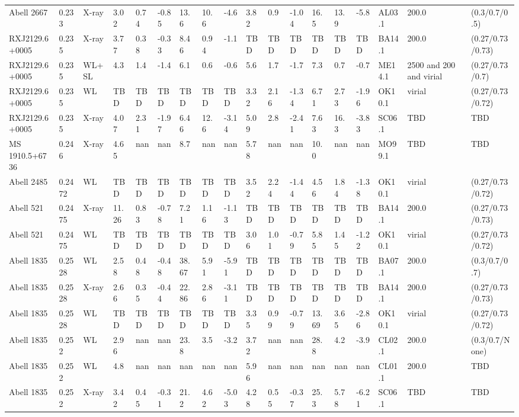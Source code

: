 \documentclass{article}
\begin{document}
\begin{center}
\begin{landscape}
\begin{longtable}{llllllllllllllllll}
Abell 2667 & 0.233 & X-ray & 3.02 & 0.74 & -0.85 & 13.6 & 10.6 & -4.6 & 3.82 & 0.9 & -1.04 & 16.5 & 13.9 & -5.8 & AL03.1 & 200.0 & (0.3/0.7/0.5) \\
RXJ2129.6+0005 & 0.235 & X-ray & 3.77 & 0.38 & -0.33 & 8.46 & 0.94 & -1.1 & TBD & TBD & TBD & TBD & TBD & TBD & BA14.1 & 200.0 & (0.27/0.73/0.73) \\
RXJ2129.6+0005 & 0.235 & WL+SL & 4.3 & 1.4 & -1.4 & 6.1 & 0.6 & -0.6 & 5.6 & 1.7 & -1.7 & 7.3 & 0.7 & -0.7 & ME14.1 & 2500 and 200 and virial & (0.27/0.73/0.7) \\
RXJ2129.6+0005 & 0.235 & WL & TBD & TBD & TBD & TBD & TBD & TBD & 3.32 & 2.16 & -1.34 & 6.71 & 2.73 & -1.96 & OK10.1 & virial & (0.27/0.73/0.72) \\
RXJ2129.6+0005 & 0.235 & X-ray & 4.07 & 2.31 & -1.97 & 6.46 & 12.6 & -3.14 & 5.09 & 2.8 & -2.41 & 7.63 & 16.3 & -3.83 & SC06.1 & TBD & TBD \\
MS 1910.5+6736 & 0.246 & X-ray & 4.65 & nan & nan & 8.7 & nan & nan & 5.78 & nan & nan & 10.0 & nan & nan & MO99.1 & TBD & TBD \\
Abell 2485 & 0.2472 & WL & TBD & TBD & TBD & TBD & TBD & TBD & 3.52 & 2.24 & -1.44 & 4.56 & 1.84 & -1.38 & OK10.1 & virial & (0.27/0.73/0.72) \\
Abell 521 & 0.2475 & X-ray & 11.26 & 0.83 & -0.78 & 7.21 & 1.16 & -1.13 & TBD & TBD & TBD & TBD & TBD & TBD & BA14.1 & 200.0 & (0.27/0.73/0.73) \\
Abell 521 & 0.2475 & WL & TBD & TBD & TBD & TBD & TBD & TBD & 3.06 & 1.01 & -0.79 & 5.85 & 1.45 & -1.22 & OK10.1 & virial & (0.27/0.73/0.72) \\
Abell 1835 & 0.2528 & WL & 2.58 & 0.48 & -0.48 & 38.67 & 5.91 & -5.91 & TBD & TBD & TBD & TBD & TBD & TBD & BA07.1 & 200.0 & (0.3/0.7/0.7) \\
Abell 1835 & 0.2528 & X-ray & 2.66 & 0.35 & -0.44 & 22.86 & 2.86 & -3.11 & TBD & TBD & TBD & TBD & TBD & TBD & BA14.1 & 200.0 & (0.27/0.73/0.73) \\
Abell 1835 & 0.2528 & WL & TBD & TBD & TBD & TBD & TBD & TBD & 3.35 & 0.99 & -0.79 & 13.69 & 3.65 & -2.86 & OK10.1 & virial & (0.27/0.73/0.72) \\
Abell 1835 & 0.252 & WL & 2.96 & nan & nan & 23.8 & 3.5 & -3.2 & 3.72 & nan & nan & 28.8 & 4.2 & -3.9 & CL02.1 & 200.0 & (0.3/0.7/None) \\
Abell 1835 & 0.252 & WL & 4.8 & nan & nan & nan & nan & nan & 5.96 & nan & nan & nan & nan & nan & CL01.1 & 200.0 & TBD \\
Abell 1835 & 0.252 & X-ray & 3.42 & 0.45 & -0.31 & 21.2 & 4.62 & -5.03 & 4.28 & 0.55 & -0.37 & 25.3 & 5.78 & -6.21 & SC06.1 & TBD & TBD \\

\end{longtable}
\end{landscape}
\end{center}
\end{document}
